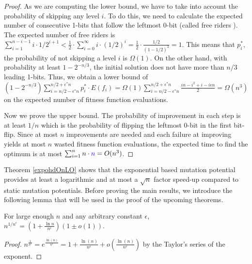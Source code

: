 \documentclass[lettersize,journal]{IEEEtran}
\begin{document}
\begin{proof}
As we are computing the lower bound, we have to take into account the probability of skipping any level $i$. To do this, we need to calculate the expected number of consecutive 1-bits that follow the leftmost 0-bit (called free riders \cite{DrosteJansenWegener2002}). The expected number of free riders is $\sum_{i=1}^{n-i-1} i \cdot 1/2^{i+1} < \frac{1}{2} \cdot \sum_{i=0}^{\infty} i \cdot (1/2)^i= \frac{1}{2} \cdot \frac{1/2}{(1-1/2)^2}=1$. This means that {\color{blue}$p^{*}_{i}$}, the probability of not skipping a level $i$ is $\Omega(1)$.
On the other hand, with probability at least $1- 2^{-n/3}$, the initial solution does not have more than $n/3$ leading 1-bits. Thus, we obtain a lower 
bound of  $(1-2^{-n/3}) \sum_{i=n/2-\epsilon^*n}^{n/2+\epsilon^*n} p^{*}_{i}\cdot E(f_i)=\Omega(1) \sum_{i=n/2-\epsilon^*n}^{n/2+\epsilon^*n} \frac{in-i^2+i-i\epsilon n}{2}=\Omega(n^3)$ on the expected number of fitness function evaluations.

Now we prove the upper bound. The probability of improvement in each step is at least $1/n$ which is the probability of flipping the leftmost 0-bit {\color{blue} in the first} bit-flip. Since at most $n$ improvements are needed and each failure at improving yields {\color{blue} at most $n$} wasted fitness function evaluations, the expected time to find the optimum is at most $\sum_{i=1}^n n \cdot {\color{blue}n}= O(n^3)$.

\end{proof}


Theorem \ref{expohdOnLO} shows that the exponential based mutation 
potential provides at least a logarithmic and at most a $\sqrt 
n$ factor speed-up compared to static mutation potentials. Before proving the main results, we introduce the following  lemma that will be used in the proof of the upcoming theorems.
\begin{lemma}\label{lem:expo}
For large enough $n$ and {\color{blue}any arbitrary constant} $\epsilon$, 
$n^{1/n^{\epsilon}}= (1+\frac{\ln{n}}{n^{\epsilon}})(1 \pm o(1))$.
\end{lemma}
\begin{proof}
	$n^{\frac{1}{n^\epsilon}} = e^{\frac{\ln(n)}{n^\epsilon}} = 1 + \frac{\ln(n)}{n^\epsilon} + o(\frac{\ln(n)}{n^\epsilon})$ by the Taylor's series of the exponent.
	
\end{proof}
\end{document}
